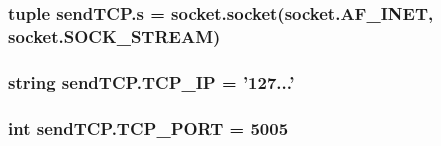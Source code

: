 \subsubsection[{s}]{\setlength{\rightskip}{0pt plus 5cm}tuple send\+T\+C\+P.\+s = socket.\+socket(socket.\+A\+F\+\_\+\+I\+N\+E\+T, socket.\+S\+O\+C\+K\+\_\+\+S\+T\+R\+E\+A\+M)}\label{namespacesendTCP_a5755bd39fa2a044b677c3f2503d4ab21}
\hypertarget{namespacesendTCP_a05a250bce739d0837d68cf4ee2493081}{}
\subsubsection[{T\+C\+P\+\_\+\+I\+P}]{\setlength{\rightskip}{0pt plus 5cm}string send\+T\+C\+P.\+T\+C\+P\+\_\+\+I\+P = '127...'}\label{namespacesendTCP_a05a250bce739d0837d68cf4ee2493081}
\hypertarget{namespacesendTCP_a2fb17394c40ece35f8159663669141ab}{}
\subsubsection[{T\+C\+P\+\_\+\+P\+O\+R\+T}]{\setlength{\rightskip}{0pt plus 5cm}int send\+T\+C\+P.\+T\+C\+P\+\_\+\+P\+O\+R\+T = 5005}\label{namespacesendTCP_a2fb17394c40ece35f8159663669141ab}
